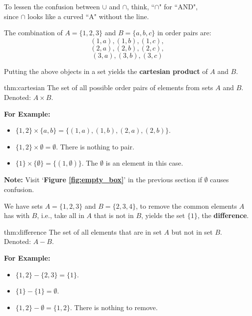 \begin{Tip}
    To lessen the confusion between $\cup$ and $\cap$, think, ``$\cap$" for ``AND",\\
    since $\cap$ looks like a curved ``A" without the line.\\
\end{Tip}

\noindent
The combination of $A=\{1,2,3\}$ and $B=\{a,b,c\}$ in order pairs are:
$$(1,a), (1,b), (1,c), $$
$$(2,a), (2,b), (2,c), $$
$$(3,a), (3,b), (3,c)$$

\noindent
Putting the above objects in a set yields the \textbf{cartesian product} of $A$ and $B$.

\begin{theo}{thm:cartesian}
    The set of all possible order pairs of elements from sets $A$ and $B$.\\
    Denoted: $A \times B$.
\end{theo}

\noindent
\textbf{For Example:}
\begin{itemize}
    \item $\{1, 2\} \times \{a, b\} = \{(1,a), (1,b), (2,a), (2,b)\}$.
    \item $\{1,2\} \times \emptyset = \emptyset$. There is nothing to pair.
    \item $\{1\} \times \{\emptyset\} = \{(1,\emptyset)\}$. The $\emptyset$ is an element in this case.
\end{itemize}

\begin{Note}
    \textbf{Note:} Visit `\textbf{Figure \ref{fig:empty_box}}' in the previous section if $\emptyset$ causes confusion.\\
\end{Note}


\noindent
We have sets $A=\{1,2,3\}$ and $B=\{2,3,4\}$, to remove the common elements
$A$ has with $B$, i.e., take all in $A$ that is not in $B$, yields the set $\{1\}$, the \textbf{difference}.\\

\begin{theo}[Difference]{thm:difference}
    The set of all elements that are in set $A$ but not in set $B$.\\
    Denoted: $A - B$.
\end{theo}

\noindent
\textbf{For Example:}
\begin{itemize}
    \item $\{1, 2\} - \{2, 3\} = \{1\}$.
    \item $\{1\} - \{1\} = \emptyset$.
    \item $\{1,2\} - \emptyset = \{1, 2\}$. There is nothing to remove.
\end{itemize}


